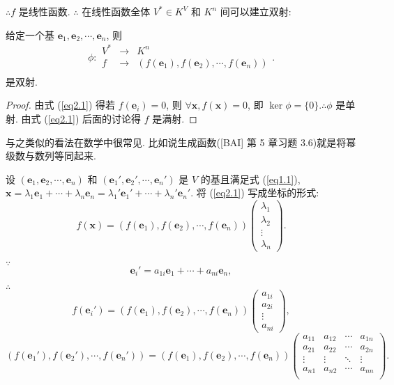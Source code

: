 \documentclass{ctexart}
\begin{document}
$\therefore f$ 是线性函数. $\therefore$ 在线性函数全体 $V^*\in K^V$ 和 $K^n$ 间可以建立双射:
\begin{theorem}\label{t2.1}
    给定一个基 $\boldsymbol{e}_1,\boldsymbol{e}_2,\cdots,\boldsymbol{e}_n$, 则
    \[\phi:\begin{array}{rcl}
        V^* & \to & K^n \\
        f & \to & (f(\boldsymbol{e}_1),f(\boldsymbol{e}_2),\cdots,f(\boldsymbol{e}_n)) \\
    \end{array}.\]
    是双射.
\end{theorem}
\begin{proof}
    由式 (\ref{eq2.1}) 得若 $f(\boldsymbol{e}_i)=0$, 则 $\forall\boldsymbol{x},f(\boldsymbol{x})=0$, 即 $\ker\phi=\{0\}.\therefore\phi$ 是单射. 由式 (\ref{eq2.1}) 后面的讨论得 $f$ 是满射. 
\end{proof}

与之类似的看法在数学中很常见. 比如说生成函数([BAI] 第 5 章习题 3.6)就是将幂级数与数列等同起来.

设 $(\boldsymbol{e}_1,\boldsymbol{e}_2,\cdots,\boldsymbol{e}_n)$ 和 $(\boldsymbol{e}_1',\boldsymbol{e}_2',\cdots,\boldsymbol{e}_n')$ 是 $V$ 的基且满足式 (\ref{eq1.1}), $\boldsymbol{x}=\lambda_1\boldsymbol{e}_1 +\cdots+\lambda_n\boldsymbol{e}_n=\lambda_1'\boldsymbol{e}_1'+\cdots+\lambda_n'\boldsymbol{e}_n'$. 将 (\ref{eq2.1}) 写成坐标的形式:
\[f(\boldsymbol{x})=(f(\boldsymbol{e}_1),f(\boldsymbol{e}_2),\cdots,f(\boldsymbol{e}_n))\begin{pmatrix}
    \lambda_1 \\
    \lambda_2 \\
    \vdots \\
    \lambda_n
\end{pmatrix}.\]

$\because$
\[\boldsymbol{e}_i'=a_{1i}\boldsymbol{e}_1+\cdots+a_{ni}\boldsymbol{e}_n,\]

$\therefore$
\[f(\boldsymbol{e}_i')=(f(\boldsymbol{e}_1),f(\boldsymbol{e}_2),\cdots,f(\boldsymbol{e}_n))\begin{pmatrix}
    a_{1i} \\
    a_{2i} \\
    \vdots \\
    a_{ni}
\end{pmatrix},\]
\[(f(\boldsymbol{e}_1'),f(\boldsymbol{e}_2'),\cdots,f(\boldsymbol{e}_n'))=(f(\boldsymbol{e}_1),f(\boldsymbol{e}_2),\cdots,f(\boldsymbol{e}_n))\begin{pmatrix}
    a_{11} & a_{12} & \cdots & a_{1n} \\
    a_{21} & a_{22} & \cdots & a_{2n} \\
    \vdots & \vdots & \ddots & \vdots \\
    a_{n1} & a_{n2} & \cdots & a_{nn} \\
\end{pmatrix}.\]
\end{document}
